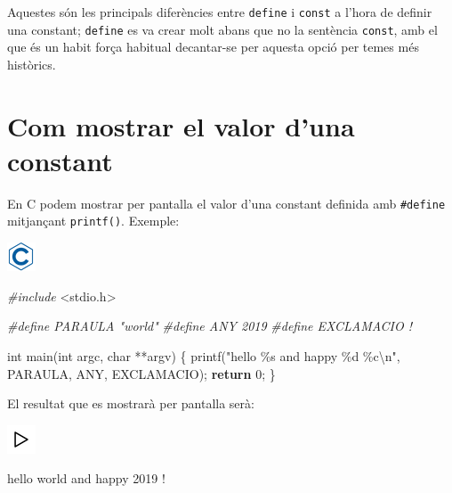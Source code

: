 \documentclass[]{book}
\newenvironment{Shaded}{\begin{snugshade}}{\end{snugshade}}
\newcommand{\ControlFlowTok}[1]{\textcolor[rgb]{0.13,0.29,0.53}{\textbf{#1}}}
\newcommand{\DataTypeTok}[1]{\textcolor[rgb]{0.13,0.29,0.53}{#1}}
\newcommand{\DecValTok}[1]{\textcolor[rgb]{0.00,0.00,0.81}{#1}}
\newcommand{\ImportTok}[1]{#1}
\newcommand{\NormalTok}[1]{#1}
\newcommand{\PreprocessorTok}[1]{\textcolor[rgb]{0.56,0.35,0.01}{\textit{#1}}}
\newcommand{\SpecialCharTok}[1]{\textcolor[rgb]{0.00,0.00,0.00}{#1}}
\newcommand{\StringTok}[1]{\textcolor[rgb]{0.31,0.60,0.02}{#1}}
\begin{document}
Aquestes són les principals diferències entre \texttt{define} i \texttt{const} a l'hora de definir una constant; \texttt{define} es va crear molt abans que no la sentència \texttt{const}, amb el que és un habit força habitual decantar-se per aquesta opció per temes més històrics.

\hypertarget{com-mostrar-el-valor-duna-constant}{%
\section{Com mostrar el valor d'una constant}\label{com-mostrar-el-valor-duna-constant}}

En C podem mostrar per pantalla el valor d'una constant definida amb \texttt{\#define} mitjançant \texttt{printf()}. Exemple:

\includegraphics{./img/c.png}

\begin{Shaded}
\begin{Highlighting}[]
\PreprocessorTok{\#include }\ImportTok{\textless{}stdio.h\textgreater{}}

\PreprocessorTok{\#define PARAULA "world"}
\PreprocessorTok{\#define ANY 2019}
\PreprocessorTok{\#define EXCLAMACIO \textquotesingle{}!\textquotesingle{}}

\DataTypeTok{int}\NormalTok{ main(}\DataTypeTok{int}\NormalTok{ argc, }\DataTypeTok{char}\NormalTok{ **argv) \{}
\NormalTok{    printf(}\StringTok{"hello \%s and happy \%d \%c}\SpecialCharTok{\textbackslash{}n}\StringTok{"}\NormalTok{, PARAULA, ANY, EXCLAMACIO);}
    \ControlFlowTok{return} \DecValTok{0}\NormalTok{;}
\NormalTok{\}}
\end{Highlighting}
\end{Shaded}

El resultat que es mostrarà per pantalla serà:

\includegraphics{./img/play.png}

\begin{Shaded}
\begin{Highlighting}[]
\NormalTok{hello world and happy }\DecValTok{2019}\NormalTok{ !}
\end{Highlighting}
\end{Shaded}
\end{document}
